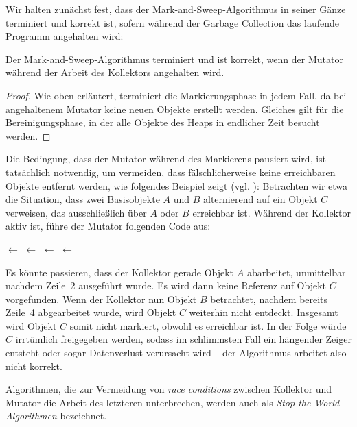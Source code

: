 Wir halten zunächst fest, dass der Mark-and-Sweep-Algorithmus in seiner Gänze terminiert und korrekt ist, sofern während der Garbage Collection das laufende Programm angehalten wird:

\begin{mybox}
\begin{satz}
	Der Mark-and-Sweep-Algorithmus terminiert und ist korrekt, wenn der Mutator während der Arbeit des Kollektors angehalten wird.
\end{satz}
\end{mybox}

\begin{proof}
	Wie oben erläutert, terminiert die Markierungsphase in jedem Fall, da bei angehaltenem Mutator keine neuen Objekte erstellt werden.
	Gleiches gilt für die Bereinigungsphase, in der alle Objekte des Heaps in endlicher Zeit besucht werden.
\end{proof}

Die Bedingung, dass der Mutator während des Markierens pausiert wird, ist tatsächlich notwendig, um vermeiden, dass fälschlicherweise keine erreichbaren Objekte entfernt werden, wie folgendes Beispiel zeigt (vgl. \cite[969]{dijkstra1978}):
Betrachten wir etwa die Situation, dass zwei Basisobjekte $A$ und $B$ alternierend auf ein Objekt $C$ verweisen, das ausschließlich über $A$ oder $B$ erreichbar ist.
Während der Kollektor aktiv ist, führe der Mutator folgenden Code aus: 

\begin{algorithmic}[1]
	\State {} $\gets$ 
	\State {} $\gets$ \Null
	\State {} $\gets$ 
	\State {} $\gets$ \Null
\end{algorithmic}

Es könnte passieren, dass der Kollektor gerade Objekt $A$ abarbeitet, unmittelbar nachdem Zeile~2 ausgeführt wurde.
Es wird dann keine Referenz auf Objekt $C$ vorgefunden.
Wenn der Kollektor nun Objekt $B$ betrachtet, nachdem bereits Zeile~4 abgearbeitet wurde, wird Objekt $C$ weiterhin nicht entdeckt.
Insgesamt wird Objekt $C$ somit nicht markiert, obwohl es erreichbar ist.
In der Folge würde $C$ irrtümlich freigegeben werden, sodass im schlimmsten Fall ein hängender Zeiger entsteht oder sogar Datenverlust verursacht wird -- der Algorithmus arbeitet also nicht korrekt.

Algorithmen, die zur Vermeidung von \textit{race conditions} zwischen Kollektor und Mutator die Arbeit des letzteren unterbrechen, werden auch als \textit{Stop-the-World-Algorithmen} bezeichnet.

